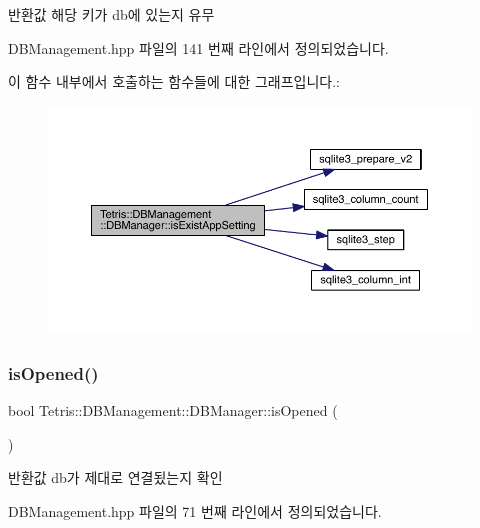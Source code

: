 \begin{DoxyReturn}{반환값}
해당 키가 db에 있는지 유무 
\end{DoxyReturn}


D\+B\+Management.\+hpp 파일의 141 번째 라인에서 정의되었습니다.

이 함수 내부에서 호출하는 함수들에 대한 그래프입니다.\+:
\nopagebreak
\begin{figure}[H]
\begin{center}
\leavevmode
\includegraphics[width=350pt]{class_tetris_1_1_d_b_management_1_1_d_b_manager_aa80722572c33389c1c73f88de9f199b6_cgraph}
\end{center}
\end{figure}
\mbox{\label{class_tetris_1_1_d_b_management_1_1_d_b_manager_a16460066d64c9183a63194177bb0458e}} 
\subsubsection{\texorpdfstring{is\+Opened()}{isOpened()}}
{\footnotesize\ttfamily bool Tetris\+::\+D\+B\+Management\+::\+D\+B\+Manager\+::is\+Opened (\begin{DoxyParamCaption}{ }\end{DoxyParamCaption})\hspace{0.3cm}{\ttfamily [inline]}}

\begin{DoxyReturn}{반환값}
db가 제대로 연결됬는지 확인 
\end{DoxyReturn}


D\+B\+Management.\+hpp 파일의 71 번째 라인에서 정의되었습니다.

